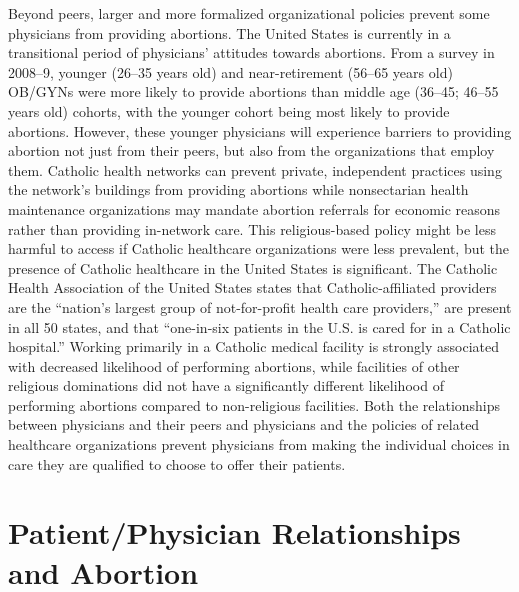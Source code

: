 \documentclass[letterpaper, 12pt]{article}
\begin{document}
Beyond peers, larger and more formalized organizational policies prevent some physicians from providing abortions.
The United States is currently in a transitional period of physicians' attitudes towards abortions.
From a survey in 2008--9, younger (26--35 years old) and near-retirement (56--65 years old) OB/GYNs were more likely to provide abortions than middle age (36--45; 46--55 years old) cohorts, with the younger cohort being most likely to provide abortions. \autocite[pg. 611]{stulberg_abortion_2011}
However, these younger physicians will experience barriers to providing abortion not just from their peers, but also from the organizations that employ them.
Catholic health networks can prevent private, independent practices using the network's buildings from providing abortions while nonsectarian health maintenance organizations may mandate abortion referrals for economic reasons rather than providing in-network care. \autocite[pg. 149]{freedman_obstacles_2010}
This religious-based policy might be less harmful to access if Catholic healthcare organizations were less prevalent, but the presence of Catholic healthcare in the United States is significant.
The Catholic Health Association of the United States states that Catholic-affiliated providers are the ``nation’s largest group of not-for-profit health care providers,'' are present in all 50 states, and that ``one-in-six patients in the U.S. is cared for in a Catholic hospital.''  \autocite{the_catholic_health_association_of_the_united_states_catholic_2016}
Working primarily in a Catholic medical facility is strongly associated with decreased likelihood of performing abortions, while facilities of other religious dominations did not have a significantly different likelihood of performing abortions compared to non-religious facilities. \autocite[pg. 612]{stulberg_abortion_2011}
Both the relationships between physicians and their peers and physicians and the policies of related healthcare organizations prevent physicians from making the individual choices in care they are qualified to choose to offer their patients.

\section*{Patient/Physician Relationships and Abortion}
\end{document}
